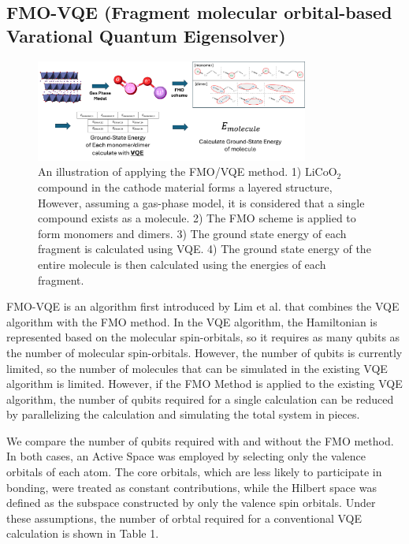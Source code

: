 \documentclass[pdflatex,sn-mathphys-num]{sn-jnl}%
\theoremstyle{thmstyleone}%
\theoremstyle{thmstyletwo}%
\theoremstyle{thmstylethree}%
\begin{document}
\subsection{FMO-VQE (Fragment molecular orbital-based Varational Quantum Eigensolver)}\label{subsec2.4}
\begin{figure}[H]
\centering
\includegraphics[width=0.8\textwidth]{fig/FMO_VQE_schme.png}
\caption{An illustration of applying the FMO/VQE method. 1) \(\mathrm{LiCoO_2}\) compound in the cathode material forms a layered structure, However, assuming a gas-phase model, it is considered that a single compound exists as a molecule. 2) The FMO scheme is applied to form monomers and dimers. 3) The ground state energy of each fragment is calculated using VQE. 4) The ground state energy of the entire molecule is then calculated using the energies of each fragment.}\label{Fig.5}
\end{figure}
FMO-VQE is an algorithm first introduced by Lim et al. that combines the VQE algorithm with the FMO method. In the VQE algorithm, the Hamiltonian is represented based on the molecular spin-orbitals, so it requires as many qubits as the number of molecular spin-orbitals. However, the number of qubits is currently limited, so the number of molecules that can be simulated in the existing VQE algorithm is limited. However, if the FMO Method is applied to the existing VQE algorithm, the number of qubits required for a single calculation can be reduced by parallelizing the calculation and simulating the total system in pieces. 

We compare the number of qubits required with and without the FMO method. 
In both cases, an Active Space was employed by selecting only the valence orbitals of each atom. 
The core orbitals, which are less likely to participate in bonding, were treated as constant contributions, 
while the Hilbert space was defined as the subspace constructed by only the valence spin orbitals\cite{AS1,AS2}. 
Under these assumptions, the number of orbtal required for a conventional VQE calculation is shown in Table 1.
\end{document}
